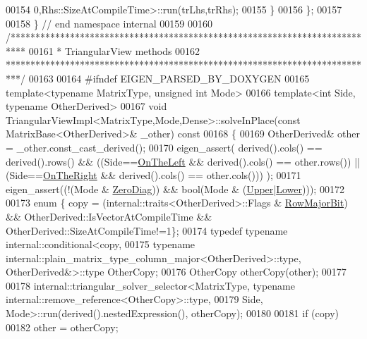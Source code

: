 \begin{DoxyCode}
00154                               0,Rhs::SizeAtCompileTime>::run(trLhs,trRhs);
00155   \}
00156 \};
00157 
00158 \} \textcolor{comment}{// end namespace internal}
00159 
00160 \textcolor{comment}{/***************************************************************************}
00161 \textcolor{comment}{* TriangularView methods}
00162 \textcolor{comment}{***************************************************************************/}
00163 
00164 \textcolor{preprocessor}{#ifndef EIGEN\_PARSED\_BY\_DOXYGEN}
00165 \textcolor{keyword}{template}<\textcolor{keyword}{typename} MatrixType, \textcolor{keywordtype}{unsigned} \textcolor{keywordtype}{int} Mode>
00166 \textcolor{keyword}{template}<\textcolor{keywordtype}{int} S\textcolor{keywordtype}{id}e, \textcolor{keyword}{typename} OtherDerived>
00167 \textcolor{keywordtype}{void} TriangularViewImpl<MatrixType,Mode,Dense>::solveInPlace(\textcolor{keyword}{const} MatrixBase<OtherDerived>& \_other)\textcolor{keyword}{ const}
00168 \textcolor{keyword}{}\{
00169   OtherDerived& other = \_other.const\_cast\_derived();
00170   eigen\_assert( derived().cols() == derived().rows() && ((Side==\hyperlink{group__enums_ggac22de43beeac7a78b384f99bed5cee0ba129609b3bdf23b071f5f86cf2f995ec4}{OnTheLeft} && derived().cols() == 
      other.rows()) || (Side==\hyperlink{group__enums_ggac22de43beeac7a78b384f99bed5cee0ba99dc75d8e00b6c3a5bdc31940f47492b}{OnTheRight} && derived().cols() == other.cols())) );
00171   eigen\_assert((!(Mode & \hyperlink{group__enums_gga39e3366ff5554d731e7dc8bb642f83cda884ff7240392e85aa6e4b3c957e36483}{ZeroDiag})) && \textcolor{keywordtype}{bool}(Mode & (\hyperlink{group__enums_gga39e3366ff5554d731e7dc8bb642f83cda6bcb58be3b8b8ec84859ce0c5ac0aaec}{Upper}|\hyperlink{group__enums_gga39e3366ff5554d731e7dc8bb642f83cda891792b8ed394f7607ab16dd716f60e6}{Lower})));
00172 
00173   \textcolor{keyword}{enum} \{ copy = (internal::traits<OtherDerived>::Flags & \hyperlink{group__flags_gae4f56c2a60bbe4bd2e44c5b19cbe8762}{RowMajorBit})  && 
      OtherDerived::IsVectorAtCompileTime && OtherDerived::SizeAtCompileTime!=1\};
00174   \textcolor{keyword}{typedef} \textcolor{keyword}{typename} internal::conditional<copy,
00175     \textcolor{keyword}{typename} internal::plain\_matrix\_type\_column\_major<OtherDerived>::type, OtherDerived&>::type OtherCopy;
00176   OtherCopy otherCopy(other);
00177 
00178   internal::triangular\_solver\_selector<MatrixType, typename internal::remove\_reference<OtherCopy>::type,
00179     Side, Mode>::run(derived().nestedExpression(), otherCopy);
00180 
00181   \textcolor{keywordflow}{if} (copy)
00182     other = otherCopy;

\end{DoxyCode}
